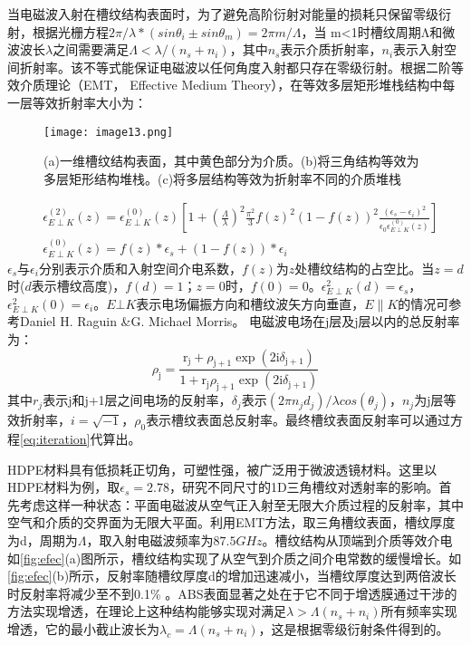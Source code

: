 当电磁波入射在槽纹结构表面时，为了避免高阶衍射对能量的损耗只保留零级衍射，根据光栅方程$2π/λ*(sinθ_i±sinθ_m )=2πm/Λ$，当 m<1时槽纹周期Λ和微波波长$λ$之间需要满足$Λ<λ/(n_s+n_i )$，其中$n_s$表示介质折射率，$n_i$表示入射空间折射率。该不等式能保证电磁波以任何角度入射都只存在零级衍射。根据二阶等效介质理论（EMT， Effective Medium Theory）\cite{RN694}，在等效多层矩形堆栈结构中每一层等效折射率大小为：
\begin{figure}[ht]
\centering
\texttt{[image: image13.png]}
\caption{\label{fig:1dg} (a)一维槽纹结构表面，其中黄色部分为介质。(b)将三角结构等效为多层矩形结构堆栈。(c)将多层结构等效为折射率不同的介质堆栈}
\end{figure}
\begin{subequations}
\begin{align}
&\epsilon_{E \perp K}^{(2)}(z)=\epsilon_{E \perp K}^{(0)}(z) {\left[1+\left(\frac{\Lambda}{\lambda}\right)^{2} \frac{\pi^{2} }{3} f(z)^{2}(1-f(z))^{2} \frac{\left(\epsilon_{s}-\epsilon_{i}\right)^{2}}{\epsilon_{0}\epsilon_{E \perp K}^{(0)}(z)}\right] } \\
&\epsilon_{E \perp K}^{(0)}(z)  =f(z) * \epsilon_{s}+(1-f(z)) * \epsilon_{i}
\end{align}
\end{subequations}
$ϵ_s$与$ϵ_i$分别表示介质和入射空间介电系数，$f(z)$为$z$处槽纹结构的占空比。当$z=d$时($d$表示槽纹高度)，$f(d)=1$；$z=0$时，$f(0)=0$。$\epsilon_{E\perp K}^2 (d)=\epsilon_s$，$\epsilon_{E\perp K}^2 (0)=ϵ_i$。$E⊥K$表示电场偏振方向和槽纹波矢方向垂直，$E\parallel	K$的情况可参考Daniel H. Raguin \&G. Michael Morris\cite{RN694}。 电磁波电场在j层及j层以内的总反射率为：
\begin{equation}\label{eq:iteration}
\rho_{\mathrm{j}}=\frac{\mathrm{r}_{\mathrm{j}}+\rho_{\mathrm{j}+1} \exp \left(2 \mathrm{i} \delta_{\mathrm{j}+1}\right)}{1+\mathrm{r}_{\mathrm{j}} \rho_{\mathrm{j}+1} \exp \left(2 \mathrm{i} \delta_{\mathrm{j}+1}\right)}
\end{equation}
其中$r_j$表示j和j+1层之间电场的反射率，$δ_j$表示$(2πn_j d_j)/λ  cos⁡(θ_j )$，$n_j$为j层等效折射率，$i=\sqrt{-1}$，$ρ_0$表示槽纹表面总反射率。最终槽纹表面反射率可以通过方程\autoref{eq:iteration}代算出。
\par HDPE材料具有低损耗正切角，可塑性强，被广泛用于微波透镜材料。这里以HDPE材料为例，取$ϵ_s=2.78$，研究不同尺寸的1D三角槽纹对透射率的影响。首先考虑这样一种状态：平面电磁波从空气正入射至无限大介质过程的反射率，其中空气和介质的交界面为无限大平面。利用EMT方法，取三角槽纹表面，槽纹厚度为d，周期为$Λ$，取入射电磁波频率为$87.5GHz$。槽纹结构从顶端到介质等效介电如\autoref{fig:efec}(a)图所示，槽纹结构实现了从空气到介质之间介电常数的缓慢增长。如\autoref{fig:efec}(b)所示，反射率随槽纹厚度d的增加迅速减小，当槽纹厚度达到两倍波长时反射率将减少至不到0.1\% 。ABS表面显著之处在于它不同于增透膜通过干涉的方法实现增透，在理论上这种结构能够实现对满足$λ>Λ(n_s+n_i )$所有频率实现增透，它的最小截止波长为$λ_c=Λ(n_s+n_i )$，这是根据零级衍射条件得到的。

